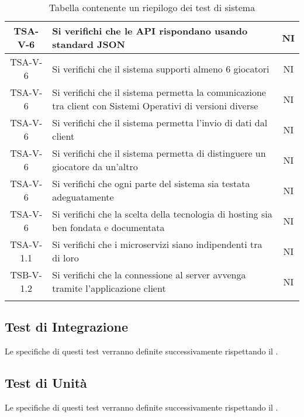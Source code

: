 \begin{center}
\begin{longtable}{|c|p{10cm}|c|}
			 \hline
			 TSA-V-6 & Si verifichi che le API rispondano usando standard JSON & NI \\
			 \hline
			 TSA-V-6 & Si verifichi che il sistema supporti almeno 6 giocatori & NI \\
			 \hline
			 TSA-V-6 & Si verifichi che il sistema permetta la comunicazione tra client con Sistemi Operativi di versioni diverse & NI \\
			 \hline
			 TSA-V-6 & Si verifichi che il sistema permetta l'invio di dati dal client& NI \\
			 \hline
			 TSA-V-6 & Si verifichi che il sistema permetta di distinguere un giocatore da un'altro & NI \\
			 \hline
			 TSA-V-6 & Si verifichi che ogni parte del sistema sia testata adeguatamente & NI \\
			 \hline
			 TSA-V-6 & Si verifichi che la scelta della tecnologia di hosting sia ben fondata e documentata & NI \\
			 \hline
			 TSA-V-1.1 & Si verifichi che i microservizi siano indipendenti tra di loro & NI \\ 
			 \hline
			 TSB-V-1.2 & Si verifichi che la connessione al server avvenga tramite l'applicazione client & NI \\
			 \hline
			 \caption{Tabella contenente un riepilogo dei test di sistema}
			\end{longtable}
		\end{center}


	\subsection{Test di Integrazione}
		Le specifiche di questi test verranno definite successivamente rispettando il . 

	\subsection{Test di Unità}
	 	Le specifiche di questi test verranno definite successivamente rispettando il . 
